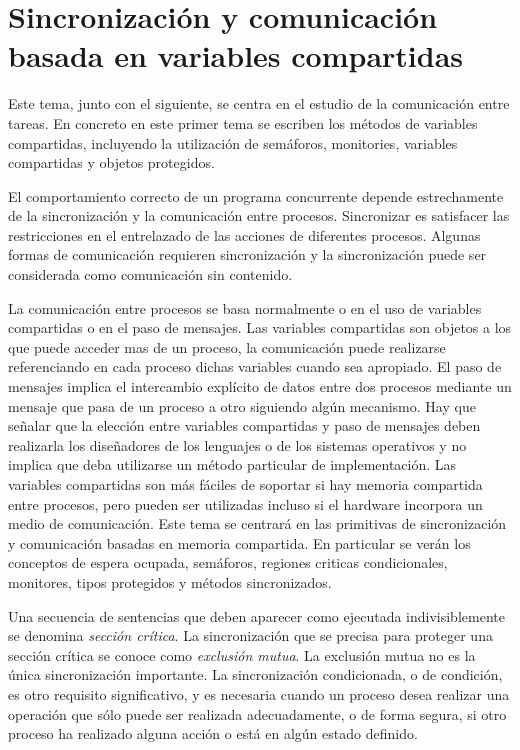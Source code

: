 \section{Sincronización y comunicación basada en variables compartidas}

Este tema, junto con el siguiente, se centra en el estudio de la comunicación
entre tareas. En concreto en este primer tema se escriben los métodos de
variables compartidas, incluyendo la utilización de semáforos, monitories,
variables compartidas y objetos protegidos.


El comportamiento correcto de un programa concurrente depende estrechamente de
la sincronización y la comunicación entre procesos. Sincronizar es satisfacer
las restricciones en el entrelazado de las acciones de diferentes procesos.
Algunas formas de comunicación requieren sincronización y la sincronización
puede ser considerada como comunicación sin contenido.


La comunicación entre procesos se basa normalmente o en el uso de variables
compartidas o en el paso de mensajes. Las variables compartidas son objetos a
los que puede acceder mas de un proceso, la comunicación puede realizarse
referenciando en cada proceso dichas variables cuando sea apropiado. El paso de
mensajes implica el intercambio explícito de datos entre dos procesos mediante
un mensaje que pasa de un proceso a otro siguiendo algún mecanismo. Hay que
señalar que la elección entre variables compartidas y paso de mensajes deben
realizarla los diseñadores de los lenguajes o de los sistemas operativos y no
implica que deba utilizarse un método particular de implementación. Las
variables compartidas son más fáciles de soportar si hay memoria compartida
entre procesos, pero pueden ser utilizadas incluso si el hardware incorpora un
medio de comunicación. Este tema se centrará en las primitivas de sincronización
y comunicación basadas en memoria compartida. En particular se verán los
conceptos de espera ocupada, semáforos, regiones criticas condicionales,
monitores, tipos protegidos y métodos sincronizados.


Una secuencia de sentencias que deben aparecer como ejecutada indivisiblemente
se denomina \emph{sección crítica}. La sincronización que se precisa para
proteger una sección crítica se conoce como \emph{exclusión mutua}. La exclusión
mutua no es la única sincronización importante. La sincronización condicionada,
o de condición, es otro requisito significativo, y es necesaria cuando un
proceso desea realizar una operación que sólo puede ser realizada adecuadamente,
o de forma segura, si otro proceso ha realizado alguna acción o está en algún
estado definido.

